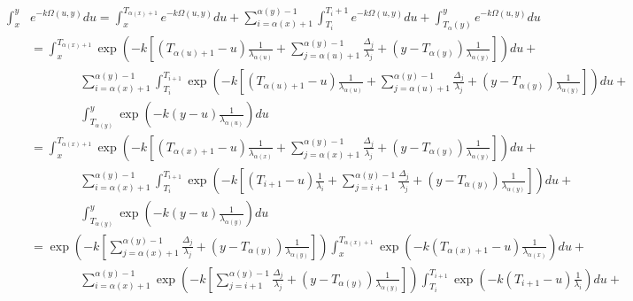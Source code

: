 \documentclass{article}
\begin{document}
\begin{align}
    \begin{split}
        \int_x^y& e^{-k\Omega(u,y)}du = 
        \int_x^{T_{\alpha(x)+1}} e^{-k\Omega(u,y)}du +
        \sum_{i=\alpha(x)+1}^{\alpha(y)-1}\int_{T_i}^{T_i+1}e^{-k\Omega(u,y)}du +
    \int_{T_\alpha(y)}^y e^{-k\Omega(u,y)}du \\
    &= \int_x^{T_{\alpha(x)+1}} \exp\left(-k\left[\left(T_{\alpha(u)+1}-u\right)\frac{1}{\lambda_{\alpha(u)}} + 
    \sum_{j=\alpha(u)+1}^{\alpha(y)-1}\frac{\Delta_j}{\lambda_j} + (y-T_{\alpha(y)})\frac{1}{\lambda_{\alpha(y)}}
    \right]\right)du + \\
    &\qquad \qquad \sum_{i=\alpha(x)+1}^{\alpha(y)-1}\int_{T_i}^{T_{i+1}}
    \exp\left(-k\left[\left(T_{\alpha(u)+1}-u\right)\frac{1}{\lambda_{\alpha(u)}} + 
    \sum_{j=\alpha(u)+1}^{\alpha(y)-1}\frac{\Delta_j}{\lambda_j} + (y-T_{\alpha(y)})\frac{1}{\lambda_{\alpha(y)}}
    \right]\right)du + \\
    &\qquad \qquad \int_{T_{\alpha(y)}}^y \exp\left(-k(y-u)\frac{1}{\lambda_{\alpha(u)}}\right)du \\
    &= \int_x^{T_{\alpha(x)+1}} \exp\left(-k\left[\left(T_{\alpha(x)+1}-u\right)\frac{1}{\lambda_{\alpha(x)}} + 
    \sum_{j=\alpha(x)+1}^{\alpha(y)-1}\frac{\Delta_j}{\lambda_j} + (y-T_{\alpha(y)})\frac{1}{\lambda_{\alpha(y)}}
    \right]\right)du + \\
    &\qquad \qquad \sum_{i=\alpha(x)+1}^{\alpha(y)-1}\int_{T_i}^{T_{i+1}}
    \exp\left(-k\left[\left(T_{i+1}-u\right)\frac{1}{\lambda_{i}} + 
    \sum_{j=i+1}^{\alpha(y)-1}\frac{\Delta_j}{\lambda_j} + (y-T_{\alpha(y)})\frac{1}{\lambda_{\alpha(y)}}
    \right]\right)du + \\
    &\qquad \qquad \int_{T_{\alpha(y)}}^y \exp\left(-k(y-u)\frac{1}{\lambda_{\alpha(y)}}\right)du \\
    &= \exp\left(-k\left[\sum_{j=\alpha(x)+1}^{\alpha(y)-1}\frac{\Delta_j}{\lambda_j} +
        (y-T_{\alpha(y)})\frac{1}{\lambda_{\alpha(y)}}\right]\right) 
        \int_x^{T_{\alpha(x)+1}} \exp\left(-k\left(T_{\alpha(x)+1}-u\right)\frac{1}{\lambda_{\alpha(x)}}\right)du + \\
    &\qquad\qquad \sum_{i=\alpha(x)+1}^{\alpha(y)-1}
        \exp\left(-k\left[\sum_{j=i+1}^{\alpha(y)-1}\frac{\Delta_j}{\lambda_j} + (y-T_{\alpha(y)})\frac{1}{\lambda_{\alpha(y)}}
        \right]\right)
    \int_{T_i}^{T_{i+1}}\exp\left(-k\left(T_{i+1}-u\right)\frac{1}{\lambda_{i}}\right)du + \\

\end{split}
\end{align}
\end{document}
